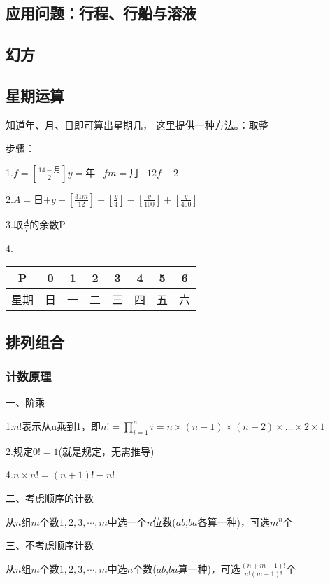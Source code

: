 \documentclass[UTF8]{ctexart}
\begin{document}
\subsection{应用问题：行程、行船与溶液}
\subsection{幻方}
\subsection{星期运算}

知道年、月、日即可算出星期几， 这里提供一种方法。\quad [\quad]：取整

步骤：

1.$f=[\frac{14- \text{月}}{2}]$\qquad $y=$年$-f$\qquad $m=$月$+12f-2$

2.$A=$日$+y+[\frac{31m}{12}]+[\frac{y}{4}]-[\frac{y}{100}]+[\frac{y}{400}]$

3.取$\frac{A}{7}$的余数P

4.

\begin{table}[H]
\begin{tabular}{|c|c|c|c|c|c|c|c|}
\hline
P  & 0 & 1 & 2 & 3 & 4 & 5 & 6 \\ \hline
星期 & 日 & 一 & 二 & 三 & 四 & 五 & 六 \\ \hline
\end{tabular}
\end{table}

\subsection{排列组合}

\subsubsection{计数原理}
一、阶乘

1.$n!$表示从n乘到1，即$n!= \displaystyle \prod_{i=1}^{n}i=n\times (n-1)\times (n-2)\times \dots \times 2\times1 $

2.规定$0!=1$(就是规定，无需推导)

4.$n\times n!=(n+1)!-n!$

二、考虑顺序的计数

从$n$组$m$个数$1,2,3,\cdots ,m$中选一个$n$位数($\overline{ab}$,$\overline{ba}$各算一种)，可选$m^n$个

三、不考虑顺序计数

从$n$组$m$个数$1,2,3,\cdots,m$中选$n$个数($\overline{ab}$,$\overline{ba}$算一种)，可选$\frac{(n+m-1)!}{n!(m-1)!}$个
\end{document}
